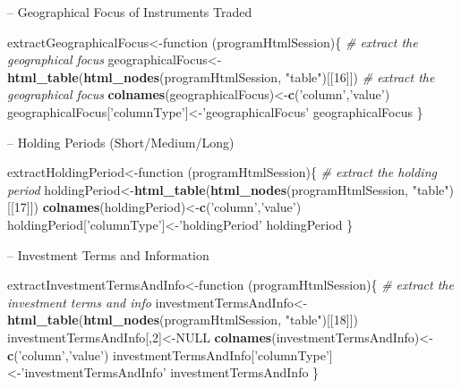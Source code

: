 \documentclass[]{article}
\newenvironment{Shaded}{\begin{snugshade}}{\end{snugshade}}
\newcommand{\KeywordTok}[1]{\textcolor[rgb]{0.13,0.29,0.53}{\textbf{{#1}}}}
\newcommand{\DecValTok}[1]{\textcolor[rgb]{0.00,0.00,0.81}{{#1}}}
\newcommand{\StringTok}[1]{\textcolor[rgb]{0.31,0.60,0.02}{{#1}}}
\newcommand{\CommentTok}[1]{\textcolor[rgb]{0.56,0.35,0.01}{\textit{{#1}}}}
\newcommand{\OtherTok}[1]{\textcolor[rgb]{0.56,0.35,0.01}{{#1}}}
\newcommand{\NormalTok}[1]{{#1}}
\begin{document}
-- Geographical Focus of Instruments Traded

\begin{Shaded}
\begin{Highlighting}[]
\NormalTok{extractGeographicalFocus<-function (programHtmlSession)\{}
  \CommentTok{# extract the geographical focus}
  \NormalTok{geographicalFocus<-}\KeywordTok{html_table}\NormalTok{(}\KeywordTok{html_nodes}\NormalTok{(programHtmlSession, }
    \StringTok{"table"}\NormalTok{)[[}\DecValTok{16}\NormalTok{]])}
  \CommentTok{# extract the geographical focus}
  \KeywordTok{colnames}\NormalTok{(geographicalFocus)<-}\KeywordTok{c}\NormalTok{(}\StringTok{'column'}\NormalTok{,}\StringTok{'value'}\NormalTok{)}
  \NormalTok{geographicalFocus[}\StringTok{'columnType'}\NormalTok{]<-}\StringTok{'geographicalFocus'}
  \NormalTok{geographicalFocus}
\NormalTok{\}}
\end{Highlighting}
\end{Shaded}

-- Holding Periods (Short/Medium/Long)

\begin{Shaded}
\begin{Highlighting}[]
\NormalTok{extractHoldingPeriod<-function (programHtmlSession)\{  }
  \CommentTok{# extract the holding period}
  \NormalTok{holdingPeriod<-}\KeywordTok{html_table}\NormalTok{(}\KeywordTok{html_nodes}\NormalTok{(programHtmlSession,}
    \StringTok{"table"}\NormalTok{)[[}\DecValTok{17}\NormalTok{]])}
  \KeywordTok{colnames}\NormalTok{(holdingPeriod)<-}\KeywordTok{c}\NormalTok{(}\StringTok{'column'}\NormalTok{,}\StringTok{'value'}\NormalTok{)}
  \NormalTok{holdingPeriod[}\StringTok{'columnType'}\NormalTok{]<-}\StringTok{'holdingPeriod'}
  \NormalTok{holdingPeriod}
\NormalTok{\}}
\end{Highlighting}
\end{Shaded}

-- Investment Terms and Information

\begin{Shaded}
\begin{Highlighting}[]
\NormalTok{extractInvestmentTermsAndInfo<-function (programHtmlSession)\{  }
  \CommentTok{# extract the investment terms and info}
  \NormalTok{investmentTermsAndInfo<-}\KeywordTok{html_table}\NormalTok{(}\KeywordTok{html_nodes}\NormalTok{(programHtmlSession, }
    \StringTok{"table"}\NormalTok{)[[}\DecValTok{18}\NormalTok{]])}
  \NormalTok{investmentTermsAndInfo[,}\DecValTok{2}\NormalTok{]<-}\OtherTok{NULL}
  \KeywordTok{colnames}\NormalTok{(investmentTermsAndInfo)<-}\KeywordTok{c}\NormalTok{(}\StringTok{'column'}\NormalTok{,}\StringTok{'value'}\NormalTok{)}
  \NormalTok{investmentTermsAndInfo[}\StringTok{'columnType'}\NormalTok{]<-}\StringTok{'investmentTermsAndInfo'}
  \NormalTok{investmentTermsAndInfo}
\NormalTok{\}}
\end{Highlighting}
\end{Shaded}
\end{document}

